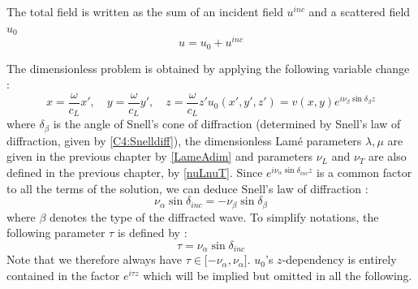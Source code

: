 The total field is written as the sum of an incident field $u^{inc}$ and a scattered field $u_0$
\begin{equation}
u=u_0+u^{inc}
\label{C4:scat}
\end{equation}

The dimensionless problem is obtained by applying the following variable change :
\begin{subequations}
\begin{equation}
x=\dfrac{\omega}{c_L}x', \hspace{1em} y=\dfrac{\omega}{c_L}y', \hspace{1em} z=\dfrac{\omega}{c_L}z'
\end{equation}
\begin{equation}
u_0(x',y',z')=v(x,y)e^{i\nu_{\beta}\sin\delta_{\beta}z}
\end{equation}
\label{C4:adiming}
\end{subequations}
where $\delta_{\beta}$ is the angle of Snell's cone of diffraction (determined by Snell's law of diffraction, given by \eqref{C4:Snelldiff}), the dimensionless Lamé parameters $\lambda,\mu$ are given in the previous chapter by \eqref{LameAdim} and parameters $\nu_L$ and $\nu_T$ are also defined in the previous chapter, by \eqref{nuLnuT}. Since $e^{i\nu_{\alpha}\sin\delta_{inc}z}$ is a common factor to all the terms of the solution, we can deduce Snell's law of diffraction :
\begin{equation}
\nu_{\alpha}\sin\delta_{inc}=-\nu_{\beta}\sin\delta_{\beta}
\label{C4:Snelldiff}
\end{equation}
where $\beta$ denotes the type of the diffracted wave. To simplify notations, the following parameter $\tau$ is defined by :
\begin{equation}
\tau=\nu_{\alpha}\sin\delta_{inc}
\label{deftau}
\end{equation}
Note that we therefore always have $\tau \in \lbrack -\nu_{\alpha}, \nu_{\alpha} \rbrack$. $u_0$'s $z$-dependency is entirely contained in the factor $e^{i\tau z}$ which will be implied but omitted in all the following.

